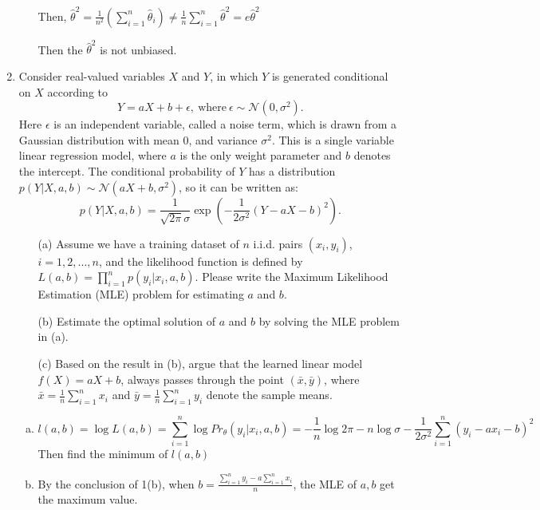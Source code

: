 \documentclass[10pt]{article}
\begin{document}
\begin{enumerate}[1.]
\begin{enumerate}[(a)]
			Then, $\hat\theta^2=\frac{1}{n^2}\left(\sum_{i=1}^{n}\hat\theta_i\right)\neq\frac{1}{n}\sum_{i=1}^n\hat\theta^2=e{\hat\theta^2}$

			Then the $\hat\theta^2$ is not unbiased.
		\end{enumerate}
		\newpage

	\item {} Consider real-valued variables $X$ and $Y$, in which $Y$ is generated conditional on $X$ according to
	$$
	Y = aX + b + \epsilon, \ \text{where} \ \epsilon \sim \mathcal{N}(0, \sigma^2).
	$$
	Here $\epsilon$ is an independent variable, called a noise term, which is drawn from a Gaussian distribution with mean 0,
	and variance $\sigma^2$. This is a single variable linear regression model, where $a$ is the only weight parameter and $b$ denotes the intercept.
	The conditional probability of $Y$ has a distribution $p(Y | X, a, b) \sim \mathcal{N}(aX+b, \sigma^2)$, so it can be written as:
	$$
	p(Y|X, a,b) = \frac{1}{\sqrt{2\pi}\sigma}\exp\left(-\frac{1}{2\sigma^2}(Y - aX -b)^2\right).
	$$
	\begin{itemize}
		\item[(a)] Assume we have a training dataset of $n$ i.i.d. pairs $(x_i, y_i)$, $i = 1, 2, ..., n$, and
		the likelihood function is defined by $L(a,b) = \prod_{i=1}^n p(y_i | x_i, a, b)$. Please write the
		Maximum Likelihood Estimation (MLE) problem for estimating $a$ and $b$.~
		\item[(b)] Estimate the optimal solution of $a$ and $b$ by solving the MLE problem in (a).~
		\item[(c)] Based on the result in (b), argue that the learned linear model $f(X) = aX + b$,
		always passes through the point $(\bar{x},\bar{y})$,
		where $\bar{x} = \tfrac{1}{n}\sum_{i=1}^{n}x_{i}$ and $\bar{y} = \tfrac{1}{n}\sum_{i=1}^{n}y_{i}$ denote the sample means.~
	\end{itemize}
	\begin{enumerate}[(a)]
		\item 
		$$l(a,b)=\log L(a,b)=\sum_{i=1}^{n}\log Pr_\theta(y_i|x_i,a,b)=-\frac{1}{n}\log2\pi-n\log\sigma-\frac{1}{2\sigma^2}\sum_{i=1}^{n}(y_i-ax_i-b)^2$$
		Then find the minimum of $l(a,b)$
		\item 
		By the conclusion of 1(b), when $b=\frac{\sum_{i=1}^{n}y_i-a\sum_{i=1}^{n}x_i}{n}$, the MLE of $a,b$ get the maximum value.


\end{enumerate}
\end{enumerate}
\end{document}
